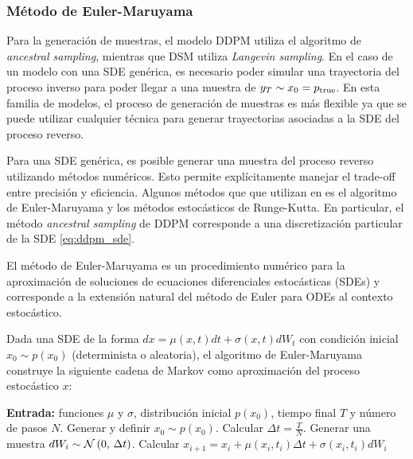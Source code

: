 \subsubsection{Método de Euler-Maruyama}

Para la generación de muestras, el modelo DDPM utiliza el algoritmo de \textit{ancestral sampling}, mientras que DSM utiliza \textit{Langevin sampling}. En el caso de un modelo con una SDE genérica, es necesario poder simular una trayectoria del proceso inverso para poder llegar a una muestra de $y_T\sim x_0=p_{\operatorname{true}}$. En esta familia de modelos, el proceso de generación de muestras es más flexible ya que se puede utilizar cualquier técnica para generar trayectorias asociadas a la SDE del proceso reverso.

Para una SDE genérica, es posible generar una muestra del proceso reverso utilizando métodos numéricos. Esto permite explícitamente manejar el trade-off entre precisión y eficiencia. Algunos métodos que que utilizan en \cite{song2021scorebased} es el algoritmo de Euler-Maruyama y los métodos estocásticos de Runge-Kutta. En particular, el método \textit{ancestral sampling} de DDPM corresponde a una discretización particular de la SDE \eqref{eq:ddpm_sde}.

El método de Euler-Maruyama es un procedimiento numérico para la aproximación de soluciones de ecuaciones diferenciales estocásticas (SDEs) y corresponde a la extensión natural del método de Euler para ODEs al contexto estocástico.

Dada una SDE de la forma $dx = \mu(x,t)dt + \sigma(x,t)dW_t$ con condición inicial $x_0\sim p(x_0)$ (determinista o aleatoria), el algoritmo de Euler-Maruyama construye la siguiente cadena de Markov como aproximación del proceso estocástico $x$:

\begin{algorithm}
    \caption{Algoritmo de Euler-Maruyama para SDEs}
    \label{alg:euler-maruyana}
    \begin{algorithmic}[1]
        \State \textbf{Entrada:} funciones $\mu$ y $\sigma$, distribución inicial $p(x_0)$, tiempo final $T$ y número de pasos $N$.
        \State Generar y definir $x_0\sim p(x_0)$.
        \State Calcular $\Delta t = \frac{T}{N}$.
        \State Generar una muestra $dW_i\sim\mathcal{N}\left(0,\,\Delta t\right)$.
        \State Calcular $x_{i+1} = x_i + \mu(x_i, t_i) \Delta t + \sigma(x_i, t_i) dW_i$
        \EndFor
    \end{algorithmic}
\end{algorithm}


